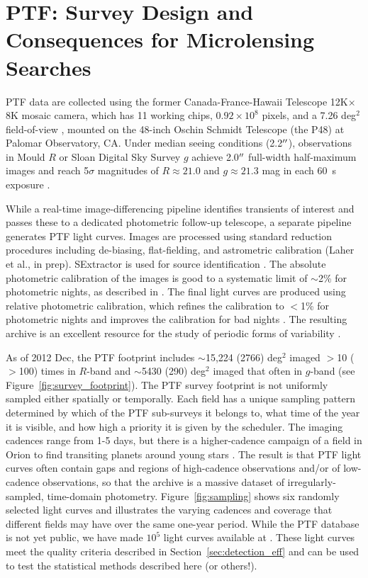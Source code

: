 \documentclass{emulateapj}
\begin{document}
\section{PTF: Survey Design and Consequences for Microlensing Searches}\label{sec:ptf} 
PTF data are collected using the former Canada-France-Hawaii Telescope 12K$\times$8K mosaic camera, which has 11 working chips, $0.92\times10^8$ pixels, and a 7.26 deg$^2$ field-of-view \citep{rahmer2008}, mounted on the 48-inch Oschin Schmidt Telescope (the P48) at Palomar Observatory, CA. Under median seeing conditions (2.2$\mbox{$^{\prime\prime}$}$), observations in Mould $R$ or Sloan Digital Sky Survey \citep[SDSS;][]{york00} $g$ achieve 2.0$\mbox{$^{\prime\prime}$}$ full-width half-maximum images and reach 5$\sigma$ magnitudes of $R \approx 21.0$ and $g \approx 21.3$ mag in each 60~s exposure \citep{nick2009,rau2009,nick2010}. 

While a real-time image-differencing pipeline identifies transients of interest and passes these to a dedicated photometric follow-up telescope, a separate pipeline generates PTF light curves. Images are processed using standard reduction procedures including de-biasing, flat-fielding, and astrometric calibration (Laher et al., in prep). SExtractor is used for source identification \citep{bertin96}. The absolute photometric calibration of the images is good to a systematic limit of $\sim$2\% for photometric nights, as described in \cite{ofek2012}.  The final light curves are produced using relative photometric calibration, which refines the calibration to $<$1\% for photometric nights and improves the calibration for bad nights \citep[Levitan et al., in prep; for algorithm details see][]{levitan2011, ofek2012}. The resulting archive is an excellent resource for the study of periodic forms of variability \citep[e.g., stellar or asteroid rotation;][]{agueros11,polishook2012}. 

As of 2012 Dec, the PTF footprint includes $\sim$15,224 (2766) deg$^2$ imaged $>$10 ($>$100) times in $R$-band and $\sim$5430 (290) deg$^2$ imaged that often in $g$-band (see Figure~\ref{fig:survey_footprint}). The PTF survey footprint is not uniformly sampled either spatially or temporally. Each field has a unique sampling pattern determined by which of the PTF sub-surveys it belongs to, what time of the year it is visible, and how high a priority it is given by the scheduler. The imaging cadences range from 1-5 days, but there is a higher-cadence campaign of a field in Orion to find transiting planets around young stars \citep{nick2009}. The result is that PTF light curves often contain gaps and regions of high-cadence observations and/or of low-cadence observations, so that the archive is a massive dataset of irregularly-sampled, time-domain photometry. Figure~\ref{fig:sampling} shows six randomly selected light curves and illustrates the varying cadences and coverage that different fields may have over the same one-year period. While the PTF database is not yet public, we have made $10^5$ light curves available at {\tt }. These light curves meet the quality criteria described in Section~\ref{sec:detection_eff} and can be used to test the statistical methods described here (or others!).
\end{document}
